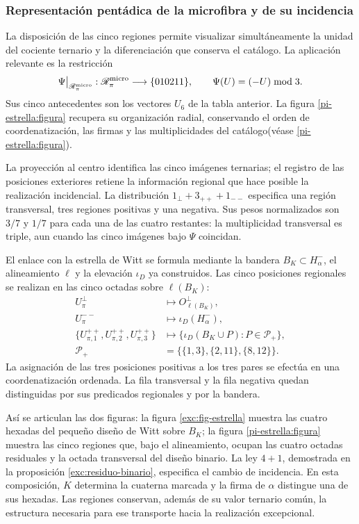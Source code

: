 \subsubsection{Representación pentádica de la microfibra y de su incidencia}
\label{pi-estrella:desarrollo}

La disposición de las cinco regiones permite visualizar simultáneamente
la unidad del cociente ternario y la diferenciación que conserva el
catálogo. La aplicación relevante es la restricción
\[
 \Psi\big|_{\mathscr R_\pi^{\rm micro}}:
 \mathscr R_\pi^{\rm micro}\longrightarrow\{010211\},
 \qquad \Psi(U)=(-U)\bmod3.
\]
Sus cinco antecedentes son los vectores \(U_6\) de la tabla anterior.
La figura \ref{pi-estrella:figura} recupera su organización radial,
conservando el orden de coordenatización, las firmas y las multiplicidades del
catálogo(véase \ref{pi-estrella:figura}).



La proyección al centro identifica las cinco imágenes ternarias; el
registro de las posiciones exteriores retiene la información regional
que hace posible la realización incidencial. La distribución
\(1_\perp+3_{++}+1_{--}\) especifica una región transversal, tres
regiones positivas y una negativa. Sus pesos normalizados son
\(3/7\) y \(1/7\) para cada una de las cuatro restantes: la
multiplicidad transversal es triple, aun cuando las cinco imágenes bajo
\(\Psi\) coincidan.

El enlace con la estrella de Witt se formula mediante la bandera
\(B_K\subset H^-_\alpha\), el alineamiento \(\ell\) y la
elevación \(\iota_D\) ya construidos. Las cinco posiciones regionales
se realizan en las cinco octadas sobre \(\ell(B_K)\):
\[
\begin{aligned}
 U_\pi^\perp&\longmapsto O^\perp_{\ell(B_K)},\\
 U_\pi^{--}&\longmapsto\iota_D(H^-_\alpha),\\
 \{U_{\pi,1}^{++},U_{\pi,2}^{++},U_{\pi,3}^{++}\}
 &\longmapsto
 \{\iota_D(B_K\cup P):P\in\mathcal P_+\},\\
 \mathcal P_+&=\bigl\{\{1,3\},\{2,11\},\{8,12\}\bigr\}.
\end{aligned}
\]
La asignación de las tres posiciones positivas a los tres pares se
efectúa en una coordenatización ordenada. La fila transversal y la fila negativa
quedan distinguidas por sus predicados regionales y por la bandera.

Así se articulan las dos figuras: la figura
\ref{exc:fig-estrella} muestra las cuatro hexadas del pequeño diseño
de Witt sobre \(B_K\); la figura \ref{pi-estrella:figura} muestra
las cinco regiones que, bajo el alineamiento, ocupan las cuatro octadas
residuales y la octada transversal del diseño binario. La ley
\(4+1\), demostrada en la proposición
\ref{exc:residuo-binario}, especifica el cambio de incidencia. En esta
composición, \(K\) determina la cuaterna marcada y la firma de
\(\alpha\) distingue una de sus hexadas. Las regiones conservan,
además de su valor ternario común, la estructura necesaria para ese
transporte hacia la realización excepcional.

